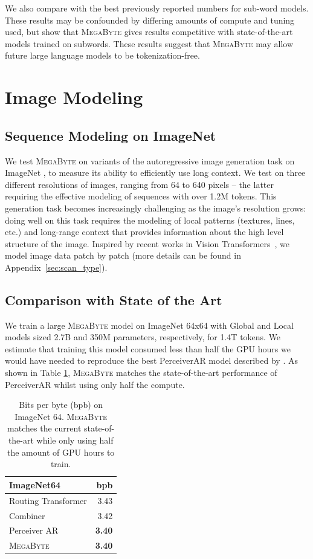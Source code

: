 \documentclass{article}
\newcommand{\fastslow}[0]{\textsc{MegaByte}\xspace}
\newcommand{\megabyte}[0]{\fastslow}
\newcommand{\bpb}[0]{bpb\xspace}
\theoremstyle{plain}
\theoremstyle{definition}
\theoremstyle{remark}
\begin{document}
We also compare with the best previously reported numbers for sub-word models. These results may be confounded by differing amounts of compute and tuning used, but show that \megabyte 
gives results competitive with state-of-the-art models trained on subwords. These results suggest that \megabyte may allow future large language models to be tokenization-free.

\section{Image Modeling}
\label{sec:image}

\subsection{Sequence Modeling on ImageNet}

We test \megabyte on variants of the autoregressive image generation task on ImageNet \citep{Oord2016PixelNetworks}, to measure its ability to efficiently use long context. We test on three different resolutions of images, ranging from 64 to 640 pixels -- the latter requiring the effective modeling of sequences with over 1.2M tokens. This generation task becomes increasingly challenging as the image's resolution grows: doing well on this task requires the modeling of local patterns (textures, lines, etc.) and long-range context that provides information about the high level structure of the image. Inspired by recent works in Vision Transformers~\citep{vit}, we model image data patch by patch (more details can be found in Appendix~\ref{sec:scan_type}). 

\subsection{Comparison with State of the Art}

We train a large \megabyte model on ImageNet 64x64 with Global and Local models sized 2.7B and 350M parameters, respectively, for 1.4T tokens. We estimate that training this model consumed less than half the GPU hours we would have needed to reproduce the best PerceiverAR model described by \citep{perceiverar}. 
As shown in Table \ref{tab:img_sota}, \megabyte matches the state-of-the-art performance of PerceiverAR whilst using only half the compute.

\begin{table}[h]
\centering
\begin{tabular}{lr}
\toprule
{ImageNet64} & \bpb\\
\midrule
Routing Transformer \citep{routing} & 3.43 \\
Combiner \citep{combiner} & 3.42 \\
Perceiver AR \citep{perceiverar} & \textbf{3.40}  \\
\megabyte &  \textbf{3.40} \\
\bottomrule
\end{tabular}
\caption{Bits per byte (\bpb) on ImageNet 64.  \megabyte matches the current state-of-the-art while only using half the amount of GPU hours to train.}
\label{tab:img_sota}
\end{table}
\end{document}
